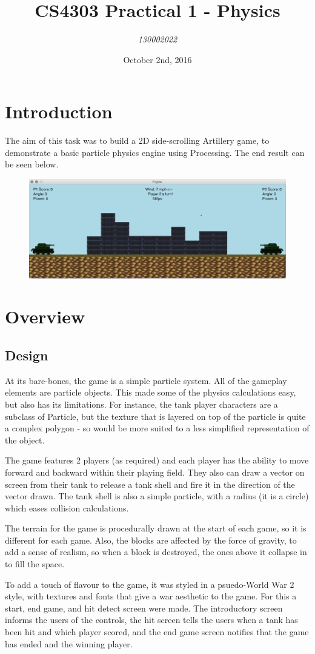 \documentclass[12pt]{article}
\title{CS4303 Practical 1 - Physics}
\author{\textit{130002022}}
\date{October 2nd, 2016}
\begin{document}
\maketitle

\section{Introduction}
The aim of this task was to build a 2D side-scrolling Artillery game, to demonstrate a basic particle physics engine using Processing. The end result can be seen below.
\begin{figure}[H]
\centerline{\includegraphics[width=17cm]{fired}}
\end{figure}

\section{Overview}
\subsection{Design}
At its bare-bones, the game is a simple particle system. All of the gameplay elements are particle objects. This made some of the physics calculations easy, but also has its limitations. For instance, the tank player characters are a subclass of Particle, but the texture that is layered on top of the particle is quite a complex polygon - so would be more suited to a less simplified representation of the object.
\par
The game features 2 players (as required) and each player has the ability to move forward and backward within their playing field. They also can draw a vector on screen from their tank to release a tank shell and fire it in the direction of the vector drawn. The tank shell is also a simple particle, with a radius (it is a circle) which eases collision calculations.
\par 
The terrain for the game is procedurally drawn at the start of each game, so it is different for each game. Also, the blocks are affected by the force of gravity, to add a sense of realism, so when a block is destroyed, the ones above it collapse in to fill the space.
\par 
To add a touch of flavour to the game, it was styled in a psuedo-World War 2 style, with textures and fonts that give a war aesthetic to the game. For this a start, end game, and hit detect screen were made. The introductory screen informs the users of the controls, the hit screen tells the users when a tank has been hit and which player scored, and the end game screen notifies that the game has ended and the winning player.
\end{document}
